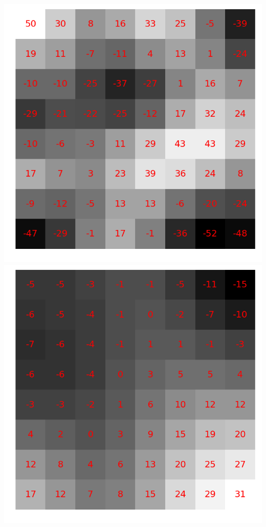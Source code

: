 \documentclass{beamer}
\begin{document}
\begin{frame}
\begin{center}
        \includegraphics[scale=0.12]{fig/8x8random1.png}
        \hspace{0.5cm}
        \includegraphics[scale=0.12]{fig/8x8random2.png}


\end{center}
\end{frame}
\end{document}
